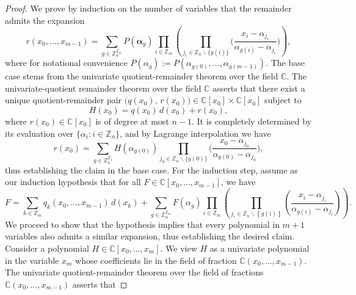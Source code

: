 \begin{proof}
We prove by induction on the number of variables that the remainder admits the expansion
\begin{equation}
r(x_{0},\ldots,x_{m-1})=\sum_{g\in\mathbb{Z}_{n}^{\mathbb{Z}_{m}}}P(\boldsymbol{\alpha}_{g})\prod_{i\in\mathbb{Z}_{m}}\left(\prod_{j_{i}\in\mathbb{Z}_{n}\backslash\{g(i)\}}\bigg(\frac{x_{i}-\alpha_{j_{i}}}{\alpha_{g(i)}-\alpha_{j_{i}}}\bigg)\right),
\end{equation}
where for notational convenience $P(\alpha_{g}):=P(\alpha_{g(0)},\ldots,\alpha_{g(m-1)})$.
The base case stems from the univariate quotient-remainder theorem over the field $\mathbb{C}$. The univariate-quotient remainder theorem over the field $\mathbb{C}$ asserts that there exist
a unique quotient-remainder pair $\big(q(x_{0}),\,r(x_{0})\big)\in\mathbb{C}[x_{0}]\times\mathbb{C}[x_{0}]$
subject to
\begin{equation}
H(x_{0})=q(x_{0})\,d(x_{0})+r(x_{0}),
\end{equation}
where $r(x_{0})\in\mathbb{C}[x_{0}]$ is of degree at most $n-1$.
It is completely determined by its evaluation over $\{\alpha_{i}:i\in\mathbb{Z}_{n}\}$,
and by Lagrange interpolation we have 
\begin{equation}
r(x_{0})=\sum_{g\in\mathbb{Z}_{n}^{\mathbb{Z}_{1}}}H(\alpha_{g(0)})\prod_{j_{0}\in\mathbb{Z}_{n}\backslash\{g(0)\}}\bigg(\frac{x_{0}-\alpha_{j_{0}}}{\alpha_{g(0)}-\alpha_{j_{0}}}\bigg),
\end{equation}
thus establishing the claim in the base case. For the induction step,
assume as our induction hypothesis that for all $F\in\mathbb{C}\left[x_{0},\ldots,x_{m-1}\right]$,
we have
\begin{equation}
F=\sum_{k\in\mathbb{Z}_{m}}q_{k}(x_{0},\ldots,x_{m-1})\,d(x_{k})+\sum_{g\in\mathbb{Z}_{n}^{\mathbb{Z}_{m}}}F(\alpha_{g})\prod_{i\in\mathbb{Z}_{m}}\left(\prod_{j_{i}\in\mathbb{Z}_{n}\backslash\left\{ g(i)\right\} }\left(\frac{x_{i}-\alpha_{j_{i}}}{\alpha_{g(i)}-\alpha_{j_{i}}}\right)\right).
\end{equation}
We proceed to show that the hypothesis implies that every polynomial in
$m+1$ variables also admits a similar expansion, thus establishing
the desired claim. Consider a polynomial $H \in \mathbb{C}[x_{0},\ldots,x_{m}]$. We view $H$ as a univariate polynomial in the variable $x_{m}$ whose coefficients lie in the field of fraction $\mathbb{C}(x_{0},\ldots,x_{m-1})$.
The univariate quotient-remainder theorem over the field of fractions $\mathbb{C}(x_{0},\ldots,x_{m-1})$ asserts that

\end{proof}
